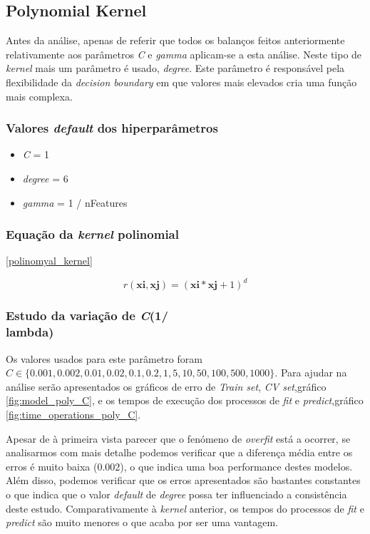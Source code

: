 \subsection{\textbf{Polynomial Kernel}}
Antes da análise, apenas de referir que todos os balanços feitos anteriormente relativamente aos parâmetros \textit{C} e \textit{gamma} aplicam-se a esta análise.
Neste tipo de \textit{kernel} mais um parâmetro é usado, \textit{degree}. Este parâmetro é responsável pela flexibilidade da \textit{decision boundary} em que valores mais elevados cria uma função mais complexa.
\subsubsection{Valores \textit{default} dos hiperparâmetros}
\begin{itemize}
    \item \textit{C} = 1 
    \item \textit{degree} = 6
    \item \textit{gamma} = 1 / nFeatures
\end{itemize}

\subsubsection{Equação da \textit{kernel} polinomial}
\ref{polinomyal_kernel}

\begin{equation}
	r(\textbf{xi},\textbf{xj}) = (\textbf{xi}*\textbf{xj} + 1)^{d}
    \label{polinomyal_kernel}
\end{equation}

\subsubsection{Estudo da variação de \textit{C}(1/\\lambda)}
Os valores usados para este parâmetro foram $\textit{C} \in \{0.001, 0.002, 0.01, 0.02, 0.1, 0.2, 1, 5, 10, 50, 100, 500, 1000\}$.
Para ajudar na análise serão apresentados os gráficos de erro de \textit{Train set}, \textit{CV set},gráfico  \ref{fig:model_poly_C}, e os tempos de execução dos processos de \textit{fit} e \textit{predict},gráfico \ref{fig:time_operations_poly_C}.

Apesar de à primeira vista parecer que o fenómeno de \textit{overfit} está  a ocorrer, se analisarmos com mais detalhe podemos verificar que a diferença média entre os erros é muito baixa (0.002), o que indica uma boa performance destes modelos.
Além disso, podemos verificar que os erros apresentados são bastantes constantes o que indica que o valor \textit{default} de \textit{degree} possa ter influenciado a consistência deste estudo.
Comparativamente à \textit{kernel} anterior, os tempos do processos de \textit{fit} e \textit{predict} são muito menores o que acaba por ser uma vantagem.


